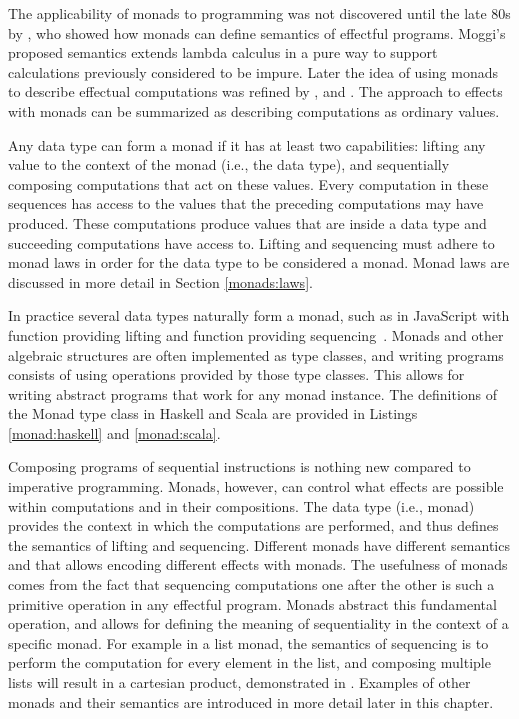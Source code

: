 



The applicability of monads to programming was not discovered until the late 80s by \textcite{comp-lambda-monads}, who showed how monads can define semantics of effectful programs. Moggi's proposed semantics extends lambda calculus in a pure way to support calculations previously considered to be impure. Later the idea of using monads to describe effectual computations was refined by \textcite{comprehending-monads}, \textcite{notions-computations} and \textcite{monads-for-fp}. The approach to effects with monads can be summarized as describing computations as ordinary values.

Any data type can form a monad if it has at least two capabilities: lifting any value to the context of the monad (i.e., the data type), and sequentially composing computations that act on these values. Every computation in these sequences has access to the values that the preceding computations may have produced. These computations produce values that are inside a data type and succeeding computations have access to. Lifting and sequencing must adhere to monad laws in order for the data type to be considered a monad. Monad laws are discussed in more detail in Section \ref{monads:laws}.

In practice several data types naturally form a monad, such as  in JavaScript with  function providing lifting and  function providing sequencing~\cite{js-array}. Monads and other algebraic structures are often implemented as type classes, and writing programs consists of using operations provided by those type classes. This allows for writing abstract programs that work for any monad instance. The definitions of the Monad type class in Haskell and Scala are provided in Listings \ref{monad:haskell} and \ref{monad:scala}.





Composing programs of sequential instructions is nothing new compared to imperative programming. Monads, however, can control what effects are possible within computations and in their compositions. The data type (i.e., monad) provides the context in which the computations are performed, and thus defines the semantics of lifting and sequencing. Different monads have different semantics and that allows encoding different effects with monads. The usefulness of monads comes from the fact that sequencing computations one after the other is such a primitive operation in any effectful program. Monads abstract this fundamental operation, and allows for defining the meaning of sequentiality in the context of a specific monad. For example in a list monad, the semantics of sequencing is to perform the computation for every element in the list, and composing multiple lists will result in a cartesian product, demonstrated in . Examples of other monads and their semantics are introduced in more detail later in this chapter.

